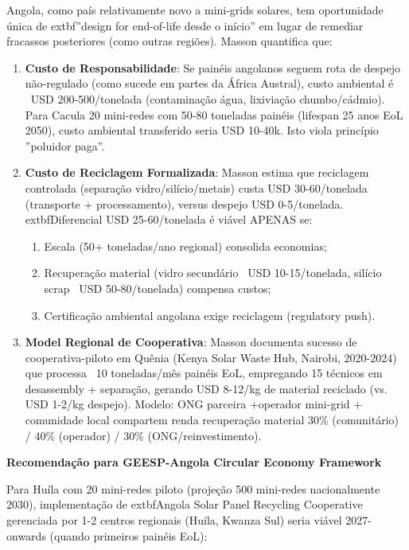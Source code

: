 \documentclass[12pt, a4paper]{article}
\begin{document}
{{{{{{{{{{{Angola, como país relativamente novo a mini-grids solares, tem oportunidade única de 	extbf{''design for end-of-life desde o início''} em lugar de remediar fracassos posteriores (como outras regiões). Masson quantifica que:

\begin{enumerate}
\item \textbf{Custo de Responsabilidade}: Se painéis angolanos seguem rota de despejo não-regulado (como sucede em partes da África Austral), custo ambiental é ~USD 200-500/tonelada (contaminação água, lixiviação chumbo/cádmio). Para Cacula 20 mini-redes com 50-80 toneladas painéis (lifespan 25 anos EoL 2050), custo ambiental transferido seria USD 10-40k. Isto viola princípio ''poluidor paga''.

\item \textbf{Custo de Reciclagem Formalizada}: Masson estima que reciclagem controlada (separação vidro/silício/metais) custa USD 30-60/tonelada (transporte + processamento), versus despejo USD 0-5/tonelada. 	extbf{Diferencial USD 25-60/tonelada é viável APENAS se:}
  \begin{enumerate}
  \item Escala (50+ toneladas/ano regional) consolida economias;
  \item Recuperação material (vidro secundário ~USD 10-15/tonelada, silício scrap ~USD 50-80/tonelada) compensa custos;
  \item Certificação ambiental angolana exige reciclagem (regulatory push).
  \end{enumerate}

\item \textbf{Model Regional de Cooperativa}: Masson documenta sucesso de cooperativa-piloto em Quênia (Kenya Solar Waste Hub, Nairobi, 2020-2024) que processa ~10 toneladas/mês painéis EoL, empregando 15 técnicos em desassembly + separação, gerando USD 8-12/kg de material reciclado (vs. USD 1-2/kg despejo). Modelo: ONG parceira +operador mini-grid + comunidade local compartem renda recuperação material 30\% (comunitário) / 40\% (operador) / 30\% (ONG/reinvestimento).

\end{enumerate}

\textbf{Recomendação para GEESP-Angola Circular Economy Framework}

Para Huíla com 20 mini-redes piloto (projeção 500 mini-redes nacionalmente 2030), implementação de 	extbf{Angola Solar Panel Recycling Cooperative} gerenciada por 1-2 centros regionais (Huíla, Kwanza Sul) seria viável 2027-onwards (quando primeiros painéis EoL):

}}}}}}}}}}}
\end{document}

